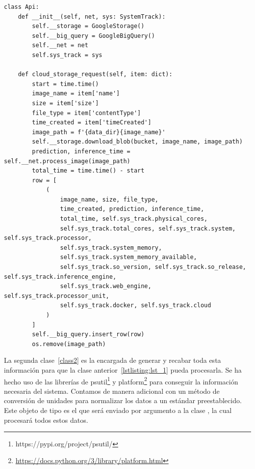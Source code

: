 \begin{lstlisting}[caption=Clase Python para la API de la aplicación.,label=class1,float=h]
    class Api:
    def __init__(self, net, sys: SystemTrack):
        self.__storage = GoogleStorage()
        self.__big_query = GoogleBigQuery()
        self.__net = net
        self.sys_track = sys

    def cloud_storage_request(self, item: dict):
        start = time.time()
        image_name = item['name']
        size = item['size']
        file_type = item['contentType']
        time_created = item['timeCreated']
        image_path = f'{data_dir}{image_name}'
        self.__storage.download_blob(bucket, image_name, image_path)
        prediction, inference_time = self.__net.process_image(image_path)
        total_time = time.time() - start
        row = [
            (
                image_name, size, file_type,
                time_created, prediction, inference_time,
                total_time, self.sys_track.physical_cores,
                self.sys_track.total_cores, self.sys_track.system, self.sys_track.processor,
                self.sys_track.system_memory,
                self.sys_track.system_memory_available,
                self.sys_track.so_version, self.sys_track.so_release, self.sys_track.inference_engine,
                self.sys_track.web_engine, self.sys_track.processor_unit,
                self.sys_track.docker, self.sys_track.cloud
            )
        ]
        self.__big_query.insert_row(row)
        os.remove(image_path)
\end{lstlisting}
La segunda clase~\ref{class2} es la encargada de generar y recabar toda esta información para que la clase anterior~\ref{lstlisting:lst_1} pueda procesarla.
Se ha hecho uso de las librerías de psutil\footnote{ https://pypi.org/project/psutil/} y platform\footnote{\url{https://docs.python.org/3/library/platform.html}} para conseguir la información necesaria del sistema.
Contamos de manera adicional con un método de conversión de unidades para normalizar los datos a un estándar preestablecido.
Este objeto de tipo  es el que será enviado por argumento a la clase , la cual procesará todos estos datos.
